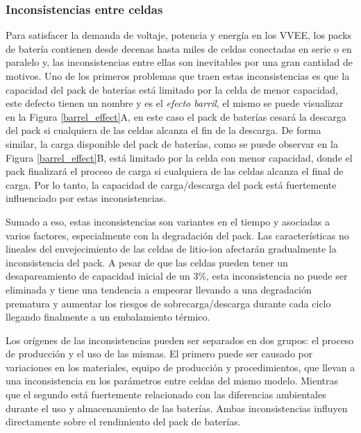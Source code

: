 \documentclass[10pt,a4paper]{article}
\begin{document}
\newpage

\subsubsection{Inconsistencias entre celdas}

Para satisfacer la demanda de voltaje, potencia y energ\'ia en los 
\acrshort{VVEE}, los packs de bater\'ia contienen desde decenas hasta miles de
celdas conectadas en serie o en paralelo y, las inconsistencias entre ellas son
inevitables por una gran cantidad de motivos. Uno de los primeros problemas que
traen estas inconsistencias es que la capacidad del pack de bater\'ias est\'a
limitado por la celda de menor capacidad, este defecto tienen un nombre y es el
\emph{efecto barril}, el mismo se puede visualizar en la Figura 
\ref{barrel_effect}A, en este caso el pack de bater\'ias cesar\'a la descarga del
pack si cualquiera de las celdas alcanza el fin de la descarga. De forma
similar, la carga disponible del pack de bater\'ias, como se puede observar en
la Figura \ref{barrel_effect}B, est\'a limitado por la celda con menor
capacidad, donde el pack finalizar\'a el proceso de carga si cualquiera de las
celdas alcanza el final de carga. Por lo tanto, la capacidad de carga/descarga
del pack est\'a fuertemente influenciado por estas inconsistencias.

Sumado a eso, estas inconsistencias son variantes en el tiempo y asociadas a
varios factores, especialmente con la degradaci\'on del pack. Las
caracter\'isticas no lineales del envejecimiento de las celdas de litio-ion
afectar\'an gradualmente la inconsistencia del pack. A pesar de que las celdas
pueden tener un desapareamiento de capacidad inicial de un 3\%, esta
inconsistencia no puede ser eliminada y tiene una tendencia a empeorar llevando
a una degradaci\'on prematura y aumentar los riesgos de sobrecarga/descarga
durante cada ciclo llegando finalmente a un embalamiento t\'ermico.

Los or\'igenes de las inconsistencias pueden ser separados en dos grupos: el
proceso de producci\'on y el uso de las mismas. El primero puede ser causado por
variaciones en los materiales, equipo de producci\'on y procedimientos, que
llevan a una inconsistencia en los par\'ametros entre celdas del mismo modelo.
Mientras que el segundo est\'a fuertemente relacionado con las diferencias
ambientales durante el uso y almacenamiento de las bater\'ias. Ambas
inconsistencias influyen directamente sobre el rendimiento del pack de
bater\'ias.
\end{document}
